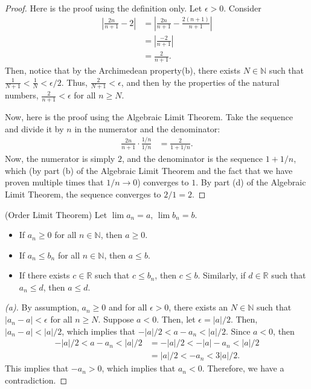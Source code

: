 \documentclass{ximera}
\begin{document}
\begin{proof}
    Here is the proof using the definition only.  Let $\epsilon > 0$.
    Consider 
    \begin{align}
        \left|\frac{2n}{n+1} -2\right| &= \left|\frac{2n}{n+1} - \frac{2(n+1)}{n+1} \right|
        \\
        &= \left|\frac{-2}{n+1}\right|
        \\
        &= \frac{2}{n+1}.
    \end{align}
    Then, notice that by the Archimedean property(b), there exists $N \in \mathbb{N}$ such that $\frac{1}{N+1} < \frac{1}N < \epsilon/2$. Thus, $\frac{2}{N+1} < \epsilon$, and then by the properties of the natural numbers, $\frac{2}{n+1} < \epsilon$ for all $n \geq N$.  

    Now, here is the proof using the Algebraic Limit Theorem.  Take the sequence and divide it by $n$ in the numerator and the denominator:
    \begin{align}
        \frac{2n}{n+1} \cdot \frac{1/n}{1/n}
        &= \frac{2}{1+1/n}.
    \end{align}
    Now, the numerator is simply $2$, and the denominator is the sequence $1+1/n$, which (by part (b) of the Algebraic Limit Theorem and the fact that we have proven multiple times that $1/n \to 0$) converges to $1$.  By part (d) of the Algebraic Limit Theorem, the sequence converges to $2/1 = 2$.
\end{proof}

\begin{theorem}{(Order Limit Theorem)}
    Let $\lim a_n = a$, $\lim b_n = b$.
    \begin{itemize}
        \item If $a_n \geq 0$ for all $n \in \mathbb{N}$, then $a \geq 0$.
        \item If $a_n \leq b_n$ for all $n \in \mathbb{N}$, then $a \leq b$.
        \item If there exists $c \in \mathbb{R}$ such that $c \leq b_n$, then $c \leq b$.  Similarly, if $d \in \mathbb{R}$ such that $a_n \leq d$, then $a \leq d$.
    \end{itemize}
\end{theorem}
\begin{proof}[(a)]
    By assumption, $a_n \geq 0$ and for all $\epsilon > 0$, there exists an $N \in \mathbb{N}$ such that $|a_n -a| < \epsilon $ for all $n \geq N$.  Suppose $a < 0$.  Then, let $\epsilon = |a|/2$.  Then, $|a_n-a| < |a|/2$, which implies that $-|a|/2 < a-a_n < |a|/2$.  Since $a < 0$, then 
    \begin{align}
       -|a|/2 < a-a_n < |a|/2
       &=
       -|a|/2 < -|a| - a_n < |a|/2
       \\
       &=
       |a|/2 < -a_n < 3|a|/2.
    \end{align}
    This implies that $-a_n > 0$, which implies that $a_n < 0$.  Therefore, we have a contradiction.
\end{proof}
\end{document}
